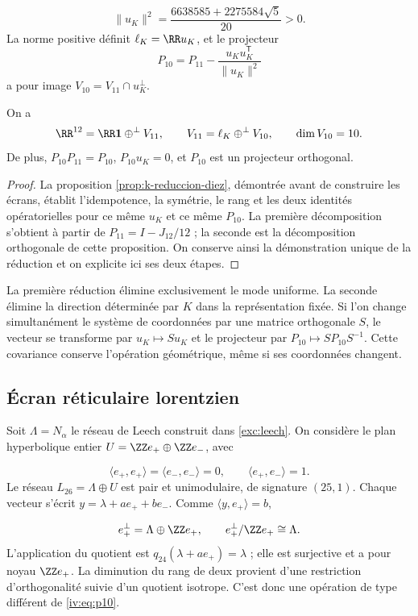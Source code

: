 \[
 \|u_K\|^2=\frac{6638585+2275584\sqrt5}{20}>0.
\]
La norme positive définit \(\ell_K=\RR u_K\), et le
projecteur
\begin{equation}
 P_{10}=P_{11}-\frac{u_Ku_K^{\mathsf T}}{\|u_K\|^2}
 \label{iv:eq:p10}
\end{equation}
a pour image \(V_{10}=V_{11}\cap u_K^\perp\).

\begin{proposition}
\label{iv:prop:12-11-10}
On a
\[
 \RR^{12}=\RR\mathbf1\mathbin{\oplus^\perp}V_{11},\qquad
 V_{11}=\ell_K\mathbin{\oplus^\perp}V_{10},\qquad
 \dim V_{10}=10.
\]
De plus, \(P_{10}P_{11}=P_{10}\), \(P_{10}u_K=0\), et
\(P_{10}\) est un projecteur orthogonal.
\end{proposition}
\begin{proof}
La proposition \ref{prop:k-reduccion-diez}, démontrée avant de
construire les écrans, établit l’idempotence, la symétrie, le rang et
les deux identités opératorielles pour ce même \(u_K\) et ce même
\(P_{10}\). La première décomposition s’obtient à partir de
\(P_{11}=I-J_{12}/12\) ; la seconde est la décomposition orthogonale
de cette proposition. On conserve ainsi la démonstration unique de la
réduction et on explicite ici ses deux étapes.
\end{proof}

La première réduction élimine exclusivement le mode uniforme.
La seconde élimine la direction déterminée par \(K\) dans
la représentation fixée. Si l’on change simultanément le système de coordonnées
par une matrice orthogonale \(S\), le vecteur se transforme par
\(u_K\mapsto Su_K\) et le projecteur par
\(P_{10}\mapsto SP_{10}S^{-1}\). Cette covariance conserve
l’opération géométrique, même si ses coordonnées changent.

\subsection{Écran réticulaire lorentzien
}

Soit \(\Lambda=N_\alpha\) le réseau de Leech construit
dans \ref{exc:leech}. On considère le plan hyperbolique entier
\(U=\ZZ e_+\oplus\ZZ e_-\), avec

\[
 \langle e_+,e_+\rangle=\langle e_-,e_-\rangle=0,
 \qquad\langle e_+,e_-\rangle=1.
\]
Le réseau \(L_{26}=\Lambda\oplus U\) est pair et
unimodulaire, de signature \((25,1)\). Chaque vecteur s’écrit
\(y=\lambda+ae_++be_-\). Comme
\(\langle y,e_+\rangle=b\),

\begin{equation}
 e_+^\perp=\Lambda\oplus\ZZ e_+,
 \qquad e_+^\perp/\ZZ e_+\cong\Lambda.
 \label{iv:eq:26-24}
\end{equation}
L’application du quotient est
\(q_{24}(\lambda+ae_+)=\lambda\) ; elle est surjective et a pour
noyau \(\ZZ e_+\). La diminution du rang de deux provient
d’une restriction d’orthogonalité suivie d’un quotient
isotrope. C’est donc une opération de type différent de
\eqref{iv:eq:p10}.


